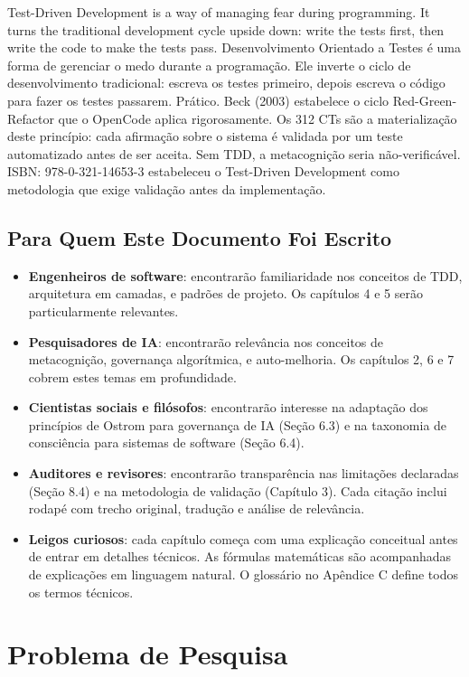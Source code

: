 {Test-Driven Development is a way of managing fear during programming. It turns the traditional development cycle upside down: write the tests first, then write the code to make the tests pass.}{%
Desenvolvimento Orientado a Testes é uma forma de gerenciar o medo durante a programação. Ele inverte o ciclo de desenvolvimento tradicional: escreva os testes primeiro, depois escreva o código para fazer os testes passarem.}{%
Prático. Beck (2003) estabelece o ciclo Red-Green-Refactor que o OpenCode aplica rigorosamente. Os 312 CTs são a materialização deste princípio: cada afirmação sobre o sistema é validada por um teste automatizado antes de ser aceita. Sem TDD, a metacognição seria não-verificável.}{%
ISBN: 978-0-321-14653-3} estabeleceu o Test-Driven Development como metodologia que exige validação antes da implementação.

\subsection{Para Quem Este Documento Foi Escrito}

\begin{itemize}
    \item \textbf{Engenheiros de software}: encontrarão familiaridade nos conceitos de TDD, arquitetura em camadas, e padrões de projeto. Os capítulos 4 e 5 serão particularmente relevantes.
    \item \textbf{Pesquisadores de IA}: encontrarão relevância nos conceitos de metacognição, governança algorítmica, e auto-melhoria. Os capítulos 2, 6 e 7 cobrem estes temas em profundidade.
    \item \textbf{Cientistas sociais e filósofos}: encontrarão interesse na adaptação dos princípios de Ostrom para governança de IA (Seção 6.3) e na taxonomia de consciência para sistemas de software (Seção 6.4).
    \item \textbf{Auditores e revisores}: encontrarão transparência nas limitações declaradas (Seção 8.4) e na metodologia de validação (Capítulo 3). Cada citação inclui rodapé com trecho original, tradução e análise de relevância.
    \item \textbf{Leigos curiosos}: cada capítulo começa com uma explicação conceitual antes de entrar em detalhes técnicos. As fórmulas matemáticas são acompanhadas de explicações em linguagem natural. O glossário no Apêndice C define todos os termos técnicos.
\end{itemize}

\section{Problema de Pesquisa}


